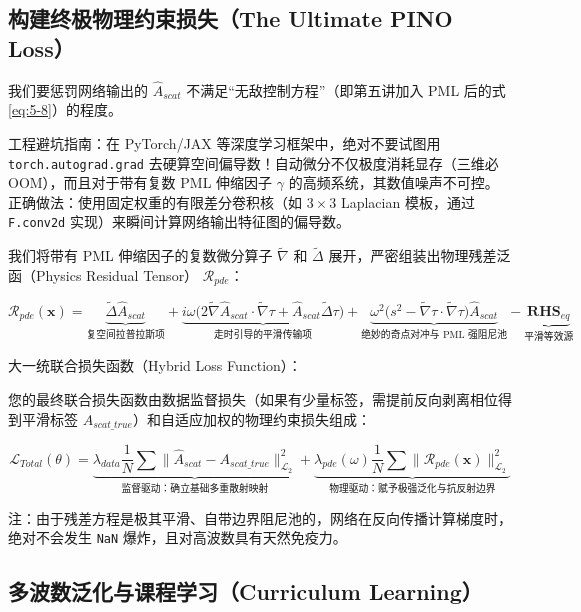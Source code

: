 \documentclass[12pt]{article}
\begin{document}
{\subsection{构建终极物理约束损失（The Ultimate PINO Loss）}

我们要惩罚网络输出的 $\hat{A}_{scat}$ 不满足“无敌控制方程”（即第五讲加入 PML 后的式 \eqref{eq:5-8}）的程度。

工程避坑指南：在 PyTorch/JAX 等深度学习框架中，绝对不要试图用 \texttt{torch.autograd.grad} 去硬算空间偏导数！自动微分不仅极度消耗显存（三维必 OOM），而且对于带有复数 PML 伸缩因子 $\gamma$ 的高频系统，其数值噪声不可控。
正确做法：使用固定权重的有限差分卷积核（如 $3\times3$ Laplacian 模板，通过 \texttt{F.conv2d} 实现）来瞬间计算网络输出特征图的偏导数。

我们将带有 PML 伸缩因子的复数微分算子 $\tilde{\nabla}$ 和 $\tilde{\Delta}$ 展开，严密组装出物理残差泛函（Physics Residual Tensor） $\mathcal{R}_{pde}$：

\begin{equation}
\mathcal{R}_{pde}(\mathbf{x})
=
\underbrace{\tilde{\Delta} \hat{A}_{scat}}_{\text{复空间拉普拉斯项}}
+
\underbrace{i \omega \big(2 \tilde{\nabla} \hat{A}_{scat} \cdot \tilde{\nabla} \tau + \hat{A}_{scat} \tilde{\Delta} \tau \big)}_{\text{走时引导的平滑传输项}}
+
\underbrace{\omega^2 \big(s^2 - \tilde{\nabla} \tau \cdot \tilde{\nabla} \tau \big) \hat{A}_{scat}}_{\text{绝妙的奇点对冲与 PML 强阻尼池}}
-
\underbrace{\mathbf{RHS}_{eq}}_{\text{平滑等效源}}
\label{eq:8-2}
\end{equation}

大一统联合损失函数（Hybrid Loss Function）：

您的最终联合损失函数由数据监督损失（如果有少量标签，需提前反向剥离相位得到平滑标签 $A_{scat\_true}$）和自适应加权的物理约束损失组成：

\begin{equation}
\mathcal{L}_{Total}(\theta)
=
\underbrace{\lambda_{data} \frac{1}{N} \sum \| \hat{A}_{scat} - A_{scat\_true} \|^2_{\mathcal{L}_2}}_{\text{监督驱动：确立基础多重散射映射}}
+
\underbrace{\lambda_{pde}(\omega) \frac{1}{N} \sum \| \mathcal{R}_{pde}(\mathbf{x}) \|^2_{\mathcal{L}_2}}_{\text{物理驱动：赋予极强泛化与抗反射边界}}
\label{eq:8-3}
\end{equation}

注：由于残差方程是极其平滑、自带边界阻尼池的，网络在反向传播计算梯度时，绝对不会发生 \texttt{NaN} 爆炸，且对高波数具有天然免疫力。

\subsection{多波数泛化与课程学习（Curriculum Learning）}

}
\end{document}

